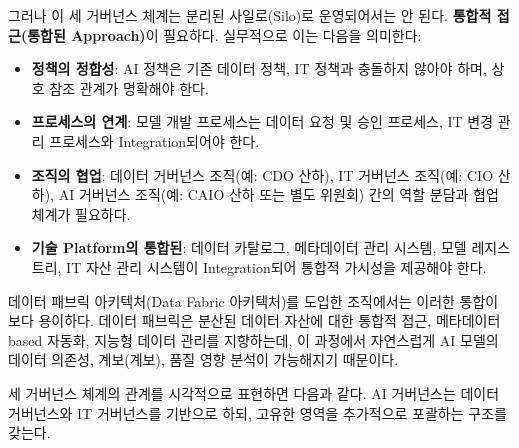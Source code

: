 그러나 이 세 거버넌스 체계는 분리된 사일로(Silo)로 운영되어서는 안 된다. \textbf{통합적 접근(통합된 Approach)}이 필요하다. 실무적으로 이는 다음을 의미한다:
\begin{itemize}
 \item \textbf{정책의 정합성}: AI 정책은 기존 데이터 정책, IT 정책과 충돌하지 않아야 하며, 상호 참조 관계가 명확해야 한다.
 \item \textbf{프로세스의 연계}: 모델 개발 프로세스는 데이터 요청 및 승인 프로세스, IT 변경 관리 프로세스와 Integration되어야 한다.
 \item \textbf{조직의 협업}: 데이터 거버넌스 조직(예: CDO 산하), IT 거버넌스 조직(예: CIO 산하), AI 거버넌스 조직(예: CAIO 산하 또는 별도 위원회) 간의 역할 분담과 협업 체계가 필요하다.
 \item \textbf{기술 Platform의 통합된}: 데이터 카탈로그, 메타데이터 관리 시스템, 모델 레지스트리, IT 자산 관리 시스템이 Integration되어 통합적 가시성을 제공해야 한다.
\end{itemize}

데이터 패브릭 아키텍처(Data Fabric 아키텍처)를 도입한 조직에서는 이러한 통합이 보다 용이하다. 데이터 패브릭은 분산된 데이터 자산에 대한 통합적 접근, 메타데이터 based 자동화, 지능형 데이터 관리를 지향하는데, 이 과정에서 자연스럽게 AI 모델의 데이터 의존성, 계보(계보), 품질 영향 분석이 가능해지기 때문이다.

세 거버넌스 체계의 관계를 시각적으로 표현하면 다음과 같다. AI 거버넌스는 데이터 거버넌스와 IT 거버넌스를 기반으로 하되, 고유한 영역을 추가적으로 포괄하는 구조를 갖는다.

